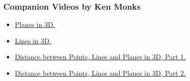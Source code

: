 \subsubsection*{Companion Videos by Ken Monks}
\begin{itemize}
\item \href{https://www.youtube.com/watch?v=ZVJzzVEpwsQ}{Planes in 3D.}
\item \href{https://www.youtube.com/watch?v=H0yZECa1HZA}{Lines in 3D.}
\item \href{https://www.youtube.com/watch?v=xxpIPthhOUg}{Distance between Points, Lines and Planes in 3D, Part 1.}
\item\href{https://www.youtube.com/watch?v=LIsp59EGbnk}{Distance between Points, Lines and Planes in 3D, Part 2.}
\end{itemize}

\renewcommand\thesubsection{\thesection.\arabic{subsection}}